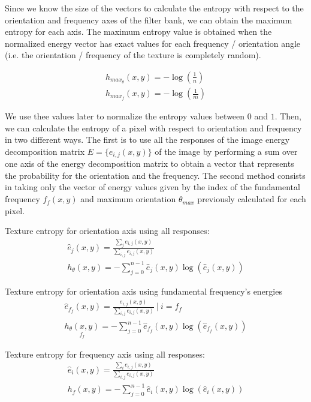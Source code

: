 Since we know the size of the vectors to calculate the entropy with respect to the orientation and frequency axes of the filter bank, we can obtain the maximum entropy for each axis. The maximum entropy value is obtained when the normalized energy vector has exact values for each frequency / orientation angle (i.e. the orientation / frequency of the texture is completely random).

\begin{gather}
    h_{max_{\theta}}(x,y) = -\log\left(\frac{1}{n}\right) \label{eq:max_entropy_orient} \\
    h_{max_f}(x,y) = -\log\left(\frac{1}{m}\right) \label{eq:max_entropy_freq}
\end{gather}

We use thee values later to normalize the entropy values between $0$ and $1$. Then, we can calculate the entropy of a pixel with respect to orientation and frequency in two different ways. The first is to use all the responses of the image energy decomposition matrix $E = \lbrace  e_{i,j}(x,y) \rbrace$ of the image by performing a sum over one axis of the energy decomposition matrix to obtain a vector that represents the probability for the orientation and the frequency. The second method consists in taking only the vector of energy values given by the index of the fundamental frequency $f_f(x,y)$ and maximum orientation $\theta_{max}$ previously calculated for each pixel.

Texture entropy for orientation axis using all responses:
\begin{gather}
    \hat{e}_{j}(x,y) = \frac{\sum_{j} e_{i,j}(x,y)}{ \sum_{i,j} e_{i,j}(x,y)}\\	
    h_{\theta}(x,y) = -\sum_{j=0}^{n-1} \hat{e}_{j}(x,y)  \log (\hat{e}_{j}(x,y)) \label{eq:entropy_orient}
\end{gather}


Texture entropy for orientation axis using fundamental frequency's energies
\begin{gather}
    \hat{e}_{f_{f}}(x,y) = \frac{e_{i,j}(x,y)}{ \sum_{i,j} e_{i,j}(x,y)} ~|~ i = f_{f}\\	
    \underset{f_{f}}{h_{\theta}(x,y)} = -\sum_{j=0}^{n-1} \hat{e}_{f_{f}}(x,y)  \log (\hat{e}_{f_{f}}(x,y))  \label{eq:entropy_fund_freq}
\end{gather}

Texture entropy for frequency axis using all responses:
\begin{gather}
    \hat{e}_{i}(x,y) = \frac{\sum_{i} e_{i,j}(x,y)}{ \sum_{i,j} e_{i,j}(x,y)}\\	
    h_f(x,y) = -\sum_{j=0}^{n-1} \hat{e}_{i}(x,y)  \log (\hat{e}_{i}(x,y))  \label{eq:entropy_freq}
\end{gather}


